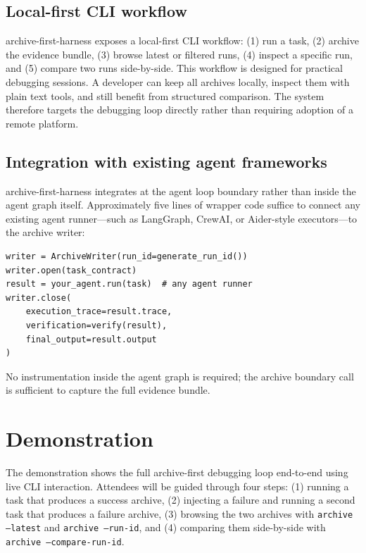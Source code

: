 \documentclass[11pt]{article}
\begin{document}
\subsection{Local-first CLI workflow}

archive-first-harness exposes a local-first CLI workflow: (1) run a task, (2) archive the evidence bundle, (3) browse latest or filtered runs, (4) inspect a specific run, and (5) compare two runs side-by-side. This workflow is designed for practical debugging sessions. A developer can keep all archives locally, inspect them with plain text tools, and still benefit from structured comparison. The system therefore targets the debugging loop directly rather than requiring adoption of a remote platform.

\subsection{Integration with existing agent frameworks}

archive-first-harness integrates at the agent loop boundary rather than inside the agent graph itself. Approximately five lines of wrapper code suffice to connect any existing agent runner---such as LangGraph, CrewAI, or Aider-style executors---to the archive writer:

{\scriptsize
\begin{verbatim}
writer = ArchiveWriter(run_id=generate_run_id())
writer.open(task_contract)
result = your_agent.run(task)  # any agent runner
writer.close(
    execution_trace=result.trace,
    verification=verify(result),
    final_output=result.output
)
\end{verbatim}
}

No instrumentation inside the agent graph is required; the archive boundary call is sufficient to capture the full evidence bundle.

\section{Demonstration}
\label{sec:demo}

The demonstration shows the full archive-first debugging loop end-to-end using live CLI interaction. Attendees will be guided through four steps: (1) running a task that produces a success archive, (2) injecting a failure and running a second task that produces a failure archive, (3) browsing the two archives with \texttt{archive --latest} and \texttt{archive --run-id}, and (4) comparing them side-by-side with \texttt{archive --compare-run-id}.
\end{document}
